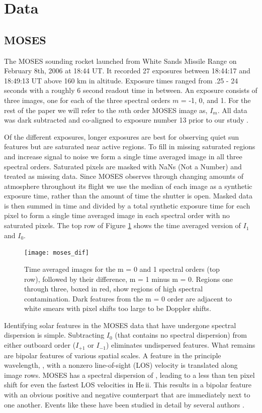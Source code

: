 \section{Data}\label{sec:data}

	\subsection{MOSES}\label{sec:MOSES_data}
	
		The MOSES sounding rocket launched from White Sands Missile Range on February 8th, 2006 at 18:44 UT. 
		It recorded 27 exposures between 18:44:17 and 18:49:13 UT above 160 km in altitude.  
		Exposure times ranged from .25 - 24 seconds with a roughly 6 second readout time in between.  
		An exposure consists of three images, one for each of the three spectral orders $m$ = -1, 0, and 1.
		For the rest of the paper we will refer to the $m$th order MOSES image as, $I_m$.  
		All data was dark subtracted and co-aligned to exposure number 13 prior to our study \citep{Fox2011}. 
		
		Of the different exposures, longer exposures are best for observing quiet sun features but are saturated near active regions.  
		To fill in missing saturated regions and increase signal to noise we form a single time averaged image in all three spectral orders. 
		Saturated pixels are masked with NaNs (Not a Number) and treated as missing data. 
		Since MOSES observes through changing amounts of atmosphere throughout its flight we use the median of each image as a synthetic exposure time, rather than the amount of time the shutter is open.
		Masked data is then summed in time and divided by a total synthetic exposure time for each pixel to form a single time averaged image in each spectral order with no saturated pixels.  
		The top row of Figure \ref{fig:moses_super} shows the time averaged version of $I_1$ and $I_0$. 
		
		\begin{figure}
			\centering
			\texttt{[image: moses\_dif]}
			\caption{Time averaged images for the m = 0 and 1 spectral orders (top row), followed by their difference, m = 1 minus m = 0.  Regions one through three, boxed in red, show regions of high spectral contamination. Dark features from the m = 0 order are adjacent to white smears with pixel shifts too large to be Doppler shifts.}
			\label{fig:moses_super}
		\end{figure}
	
		
		Identifying solar features in the MOSES data that have undergone spectral dispersion is simple. 
		Subtracting $I_0$ (that contains no spectral dispersion) from either outboard order ($I_{+1}$ or $I_{-1}$) eliminates undispersed features. 
		What remains are bipolar features of various spatial scales.  
		A feature in the principle wavelength, \heii, with a nonzero line-of-sight (LOS) velocity is translated along image rows.    
		MOSES has a spectral dispersion of \spectdispersvel, leading to a less than ten pixel shift for even the fastest LOS velocities in He\,{\sc ii}. 
		This results in a bipolar feature with an obvious positive and negative counterpart that are immediately next to one another. Events like these have been studied in detail by several authors \citep{Fox2011,Courrier2018,Rust2019}.
		
